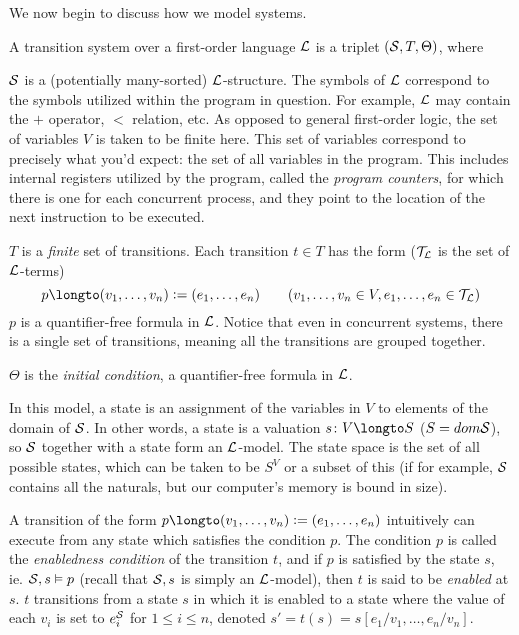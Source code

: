 We now begin to discuss how we model systems.

\bdefn

    A {\emphcolor transition system} over a first-order language ${\cal L}$ is a triplet $({\cal S},T,\Theta)$, where
    \benum
        \item ${\cal S}$ is a (potentially many-sorted) ${\cal L}$-structure.
            The symbols of ${\cal L}$ correspond to the symbols utilized within the program in question.
            For example, ${\cal L}$ may contain the $+$ operator, $<$ relation, etc.
            As opposed to general first-order logic, the set of variables $V$ is taken to be finite here.
            This set of variables correspond to precisely what you'd expect: the set of all variables in the program.
            This includes internal registers utilized by the program, called the {\it program counters}, for which there is one for each concurrent process, and they point to the location of the next
            instruction to be executed.
        \item $T$ is a {\it finite} set of {\emphcolor transitions}.
            Each transition $t\in T$ has the form (${\cal T}_{\cal L}$ is the set of ${\cal L}$-terms)
            $$ p\longto (v_1,\dots,v_n)\coloneqq(e_1,\dots,e_n) \qquad (v_1,\dots,v_n\in V,e_1,\dots,e_n\in{\cal T}_{\cal L}) $$
            $p$ is a quantifier-free formula in ${\cal L}$.
            Notice that even in concurrent systems, there is a single set of transitions, meaning all the transitions are grouped together.
        \item $\Theta$ is the {\it initial condition}, a quantifier-free formula in ${\cal L}$.
    \eenum

    In this model, a {\emphcolor state} is an assignment of the variables in $V$ to elements of the domain of ${\cal S}$.
    In other words, a state is a valuation $s\colon V\longto S$ ($S={\sl dom}{\cal S}$), so ${\cal S}$ together with a state form an ${\cal L}$-model.
    The {\emphcolor state space} is the set of all possible states, which can be taken to be $S^V$ or a subset of this (if for example, ${\cal S}$ contains all the naturals, but our computer's memory is
    bound in size).
\edefn

A transition of the form $p\longto(v_1,\dots,v_n)\coloneqq(e_1,\dots,e_n)$ intuitively can execute from any state which satisfies the condition $p$.
The condition $p$ is called the {\it enabledness condition} of the transition $t$, and if $p$ is satisfied by the state $s$, ie. ${\cal S},s\vDash p$ (recall that ${\cal S},s$ is simply an ${\cal L}$-model),
then $t$ is said to be {\it enabled} at $s$.
$t$ transitions from a state $s$ in which it is enabled to a state where the value of each $v_i$ is set to $e_i^{\cal S}$ for $1\leq i\leq n$, denoted $s'=t(s)=s[e_1/v_1,\dots,e_n/v_n]$.

